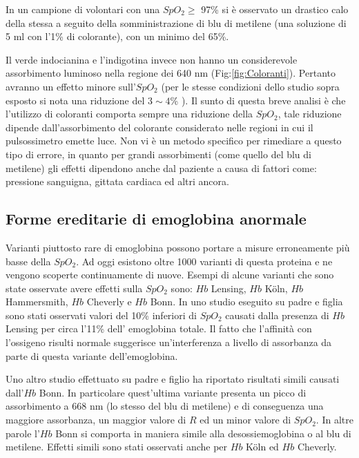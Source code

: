 \documentclass[12pt,a4paper, twoside, openright]{report}
\begin{document}
In un campione di volontari con una $SpO_2 \geq$ 97\% si è osservato un drastico calo della stessa a seguito della somministrazione di blu di metilene (una soluzione di 5 ml con l'1\% di colorante), con un minimo del 65\%.%
\newline

Il verde indocianina e l'indigotina invece non hanno un considerevole assorbimento luminoso nella regione dei 640 nm (Fig:\ref{fig:Coloranti}). 
Pertanto avranno un effetto minore sull'$SpO_2$ (per le stesse condizioni dello studio sopra esposto si nota una riduzione del $3\sim4$\% ). 
Il sunto di questa breve analisi è che l'utilizzo di coloranti comporta sempre una riduzione della $SpO_2$, tale riduzione dipende dall'assorbimento del colorante considerato nelle regioni in cui il pulsossimetro emette luce. 
Non vi è un metodo specifico per rimediare a questo tipo di errore, in quanto per grandi assorbimenti (come quello del blu di metilene) gli effetti dipendono anche dal paziente a causa di fattori come: pressione sanguigna, gittata cardiaca ed altri ancora.


\subsection{Forme ereditarie di emoglobina anormale}

Varianti piuttosto rare di emoglobina possono portare a misure erroneamente più basse della $SpO_2$. 
Ad oggi esistono oltre 1000 varianti di questa proteina e ne vengono scoperte continuamente di nuove. 
Esempi di alcune varianti che sono state osservate avere effetti sulla $SpO_2$ sono: $Hb$ Lensing, $Hb$ K\"oln, $Hb$ Hammersmith, $Hb$ Cheverly e $Hb$ Bonn. 
In uno studio eseguito su padre e figlia sono stati osservati valori del 10\% inferiori di $SpO_2$ causati dalla presenza di $Hb$ Lensing per circa l'11\% dell' emoglobina totale.%
Il fatto che l'affinità con l'ossigeno risulti normale suggerisce un'interferenza a livello di assorbanza da parte di questa variante dell'emoglobina. 
\newline

Uno altro studio effettuato su padre e figlio ha riportato risultati simili causati dall'$Hb$ Bonn.%
In particolare quest'ultima variante presenta un picco di assorbimento a 668 nm (lo stesso del blu di metilene) e di conseguenza una maggiore assorbanza, un maggior valore di $R$ ed un minor valore di $SpO_2$. 
In altre parole l'$Hb$ Bonn si comporta in maniera simile alla desossiemoglobina o al blu di metilene. 
Effetti simili sono stati osservati anche per $Hb$ K\"oln ed $Hb$ Cheverly.
\end{document}
